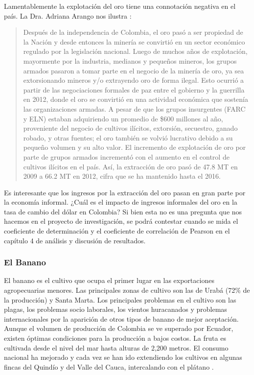 \begin{spacing}{1.5}
Lamentablemente la explotación del oro tiene una connotación negativa en el país. La Dra. Adriana Arango nos ilustra \cite{arango_2017}:

\begin{quote}
Después de la independencia de Colombia, el oro pasó a ser propiedad de la Nación y desde entonces la minería se convirtió en un sector económico regulado por la legislación nacional. Luego de muchos años de explotación, mayormente por la industria, medianos y pequeños mineros, los grupos armados pasaron a tomar parte en el negocio de la minería de oro, ya sea extorsionando mineros y/o extrayendo oro de forma ilegal. Esto ocurrió a partir de las negociaciones formales de paz entre el gobierno y la guerrilla en 2012, donde el oro se convirtió en una actividad económica que sostenía las organizaciones armadas. A pesar de que los grupos insurgentes (FARC y ELN) estaban adquiriendo un promedio de \$600 millones al año, proveniente del negocio de cultivos ilícitos, extorsión, secuestro, ganado robado, y otras fuentes; el oro también se volvió lucrativo debido a su pequeño volumen y su alto valor. El incremento de explotación de oro por parte de grupos armados incrementó con el aumento en el control de cultivos ilícitos en el país. Así, la extracción de oro pasó de 47.8 MT en 2009 a 66.2 MT en 2012, cifra que se ha mantenido hasta el 2016.
\end{quote}

Es interesante que los ingresos por la extracción del oro pasan en gran parte por la economía informal. ¿Cuál es el impacto de ingresos informales del oro en la tasa de cambio del dólar en Colombia? Si bien esta no es una pregunta que nos hacemos en el proyecto de investigación, se podrá contestar cuando se mida el coeficiente de determinación y el coeficiente de correlación de Pearson en el capítulo 4 de análisis y discusión de resultados.  

\subsubsection{El Banano}
El banano es el cultivo que ocupa el primer lugar en las exportaciones agropecuarias menores. Las principales zonas de cultivo son las de Urabá (72\% de la producción) y Santa Marta. Los principales problemas en el cultivo son las plagas, los problemas socio laborales, los vientos huracanados y problemas internacionales por la aparición de otros tipos de banano de mejor aceptación. Aunque el volumen de producción de Colombia se ve superado por Ecuador, existen óptimas condiciones para la producción a bajos costos. La fruta es cultivada desde el nivel del mar hasta alturas de 2,200 metros. El consumo nacional ha mejorado y cada vez se han ido extendiendo los cultivos en algunas fincas del Quindío y del Valle del Cauca, intercalando con el plátano \cite{bananoC}.


\end{spacing}
